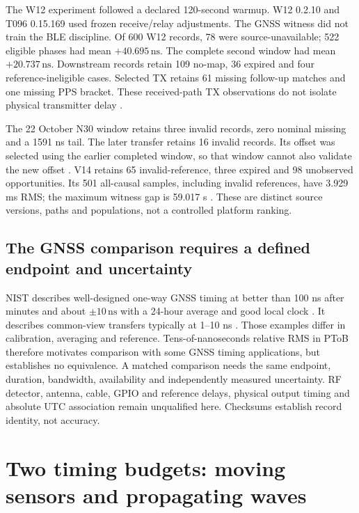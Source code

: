 \documentclass[11pt,letterpaper]{article}
\newcommand{\ns}{\,\mathrm{ns}}\newcommand{\us}{\,\mu\mathrm{s}}\newcommand{\ms}{\,\mathrm{ms}}
\begin{document}
The W12 experiment followed a declared 120-second warmup. W12 0.2.10 and T096 0.15.169 used frozen receive/relay adjustments. The GNSS witness did not train the BLE discipline. Of 600 W12 records, 78 were source-unavailable; 522 eligible phases had mean $+40.695\ns$. The complete second window had mean $+20.737\ns$. Downstream records retain 109 no-map, 36 expired and four reference-ineligible cases. Selected TX retains 61 missing follow-up matches and one missing PPS bracket. These received-path TX observations do not isolate physical transmitter delay \cite{w12}.

The 22 October N30 window retains three invalid records, zero nominal missing and a 1591 ns tail. The later transfer retains 16 invalid records. Its offset was selected using the earlier completed window, so that window cannot also validate the new offset \cite{fine}. V14 retains 65 invalid-reference, three expired and 98 unobserved opportunities. Its 501 all-causal samples, including invalid references, have 3.929 ms RMS; the maximum witness gap is 59.017 s \cite{v14}. These are distinct source versions, paths and populations, not a controlled platform ranking.

\subsection{The GNSS comparison requires a defined endpoint and uncertainty}
NIST describes well-designed one-way GNSS timing at better than 100 ns after minutes and about $\pm10\ns$ with a 24-hour average and good local clock \cite{gnssone}. It describes common-view transfers typically at 1--10 ns \cite{gnsscommon}. Those examples differ in calibration, averaging and reference. Tens-of-nanoseconds relative RMS in PToB therefore motivates comparison with some GNSS timing applications, but establishes no equivalence. A matched comparison needs the same endpoint, duration, bandwidth, availability and independently measured uncertainty. RF detector, antenna, cable, GPIO and reference delays, physical output timing and absolute UTC association remain unqualified here. Checksums establish record identity, not accuracy.

\section{Two timing budgets: moving sensors and propagating waves}\label{sec:budgets}
\end{document}
